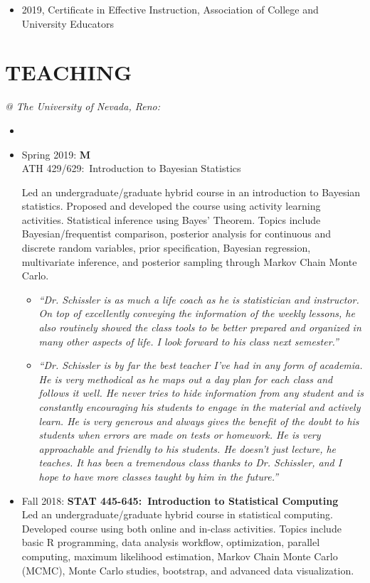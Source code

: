 \documentclass[paper=a4,fontsize=11pt]{scrartcl} %
\newcommand{\NewPart}[2]{\section*{\uppercase{#1} #2 }}
\newcommand{\CourseEntry}[3]{
		\noindent \item{#1: \textbf{#2} \\ #3}}
\begin{document}
\begin{itemize}[noitemsep]
    \item 2019, Certificate in Effective Instruction, Association of College and University Educators
\end{itemize}


\NewPart{Teaching}{}
\vspace{-7pt}
\textit{@ The University of Nevada, Reno:}
\begin{itemize}[noitemsep]
\item[]
\vspace{-15pt}

\CourseEntry{Spring 2019}MATH 429/629{:~Introduction to Bayesian Statistics}{Led an undergraduate/graduate hybrid course in an introduction to Bayesian statistics. Proposed and developed the course using activity learning activities. Statistical inference using Bayes’ Theorem. Topics include Bayesian/frequentist comparison, posterior analysis for continuous and discrete random variables, prior specification, Bayesian regression, multivariate inference, and posterior sampling through Markov Chain Monte Carlo.

\begin{itemize}
\item \emph{\small{``Dr. Schissler is as much a life coach as he is statistician and instructor. On top of excellently conveying the information of the weekly lessons, he also routinely showed the class tools to be better prepared and organized in many other aspects of life. I look forward to his class next semester.''}}
\item \emph{\small{``Dr. Schissler is by far the best teacher I've had in any form of academia. He is very methodical as he maps out a day plan for each class and follows it well. He never tries to hide information from any student and is constantly encouraging his students to engage in the material and actively learn. He is very generous and always gives the benefit of the doubt to his students when errors are made on tests or homework. He is very approachable and
friendly to his students. He doesn't just lecture, he teaches. It has been a tremendous class thanks to Dr. Schissler, and I hope to have more classes taught by him in the future.''}}
\end{itemize}
}{} 

\CourseEntry{Fall 2018}{STAT 445-645:~Introduction to Statistical Computing}{Led an undergraduate/graduate hybrid course in statistical computing. Developed course using both online and in-class activities. Topics include basic R programming, data analysis workflow, optimization, parallel computing, maximum likelihood estimation, Markov Chain Monte Carlo (MCMC), Monte Carlo studies, bootstrap, and advanced data visualization.

}
\end{itemize}
\end{document}
